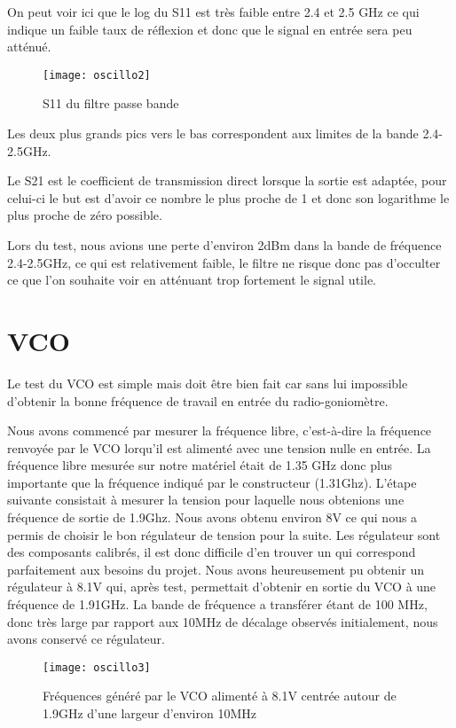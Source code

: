 On peut voir ici que le log du S11 est très faible entre 2.4 et 2.5 GHz ce qui indique un faible taux de réflexion et donc que le signal en entrée sera peu atténué.

\begin{figure}[h]
  \centering
  \texttt{[image: oscillo2]}
  \caption{S11 du filtre passe bande}
  \label{fig:filtre}
\end{figure}


Les deux plus grands pics vers le bas correspondent aux limites de la bande 2.4-2.5GHz.

Le S21 est le coefficient de transmission direct lorsque la sortie est adaptée, pour celui-ci le but est d’avoir ce nombre le plus proche de 1 et donc son logarithme le plus proche de zéro possible.

Lors du test, nous avions une perte d’environ 2dBm dans la bande de fréquence 2.4-2.5GHz, ce qui est relativement faible, le filtre ne risque donc pas d’occulter ce que l’on souhaite voir en atténuant trop fortement le signal utile.
\newpage
\section{VCO}



Le test du VCO est simple mais doit être bien fait car sans lui impossible d’obtenir la bonne fréquence de travail en entrée du radio-goniomètre.

Nous avons commencé par mesurer la fréquence libre, c’est-à-dire la fréquence renvoyée par le VCO lorqu'il est alimenté avec une tension nulle en entrée. La fréquence libre mesurée sur notre matériel était de 1.35 GHz donc plus importante que la fréquence indiqué par le constructeur (1.31Ghz). L'étape suivante consistait à mesurer la tension pour laquelle nous obtenions une fréquence de sortie de 1.9Ghz. Nous avons obtenu environ 8V ce qui nous a permis de choisir le bon régulateur de tension pour la suite.
 Les régulateur sont des composants calibrés, il est donc difficile d’en trouver un qui correspond parfaitement aux besoins du projet. Nous avons heureusement pu obtenir un régulateur à 8.1V qui, après test, permettait d'obtenir en sortie du VCO à une fréquence de 1.91GHz. La bande de fréquence a transférer étant de 100 MHz, donc très large par rapport aux 10MHz de décalage observés initialement, nous avons conservé ce régulateur.


\begin{figure}[h]
  \centering
  \texttt{[image: oscillo3]}
  \caption{Fréquences généré par le VCO alimenté à 8.1V centrée autour de 1.9GHz d’une largeur d’environ 10MHz}
  \label{fig:freq}
\end{figure}
\newpage
